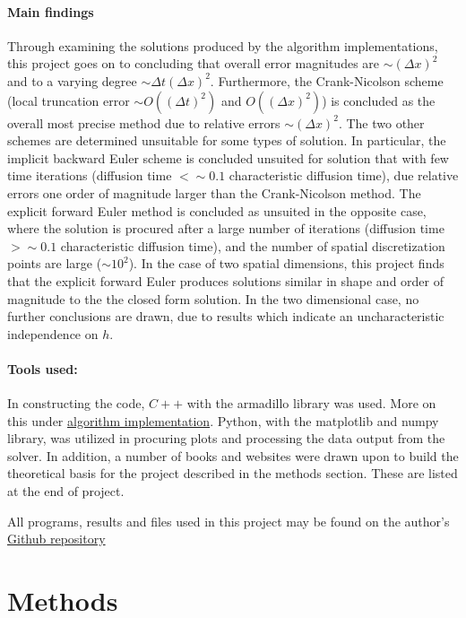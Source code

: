 \documentclass[%
oneside,                 %
final,                   %
10pt]{article}
\begin{document}
\paragraph{Main findings}
Through examining the solutions produced by the algorithm implementations, this project goes on to concluding that overall error magnitudes are $\sim (\Delta x)^2$ and to a varying degree  $\sim \Delta t (\Delta x)^2$. Furthermore, the Crank-Nicolson scheme (local truncation error $\sim O((\Delta t)^2)$ and $O((\Delta x)^2)$) is concluded as the overall most precise method due to relative errors $\sim (\Delta x)^2$.  The two other schemes are determined unsuitable for some types of solution. In particular, the implicit backward Euler scheme is concluded unsuited for solution that with few time iterations (diffusion time $<\sim 0.1$ characteristic diffusion time), due relative errors one order of magnitude larger than the Crank-Nicolson method. The explicit forward Euler method is concluded as unsuited in the opposite case, where the solution is procured after a large number of iterations (diffusion time $>\sim 0.1$ characteristic diffusion time), and the number of spatial discretization points are large ($\sim 10^2$). \newline
In the case of two spatial dimensions, this project finds that the explicit forward Euler produces solutions similar in shape and order of magnitude to the the closed form solution. In the two dimensional case, no further conclusions are drawn, due to results which indicate an uncharacteristic independence on $h$. 
\paragraph{Tools used:} 
In constructing the code, $C++$ with the armadillo library was used. More on this under \hyperref[M.AlgoImpl]{algorithm implementation}. Python, with the matplotlib and numpy library, was utilized in procuring plots and processing the data output from the solver. In addition, a number of books and websites were drawn upon to build the theoretical basis for the project described in the methods section. These are listed at the end of project.

All programs, results and files used in this project may be found on the author's \href{https://github.com/johanere/CP5}{Github repository}




\section{Methods}
\end{document}
